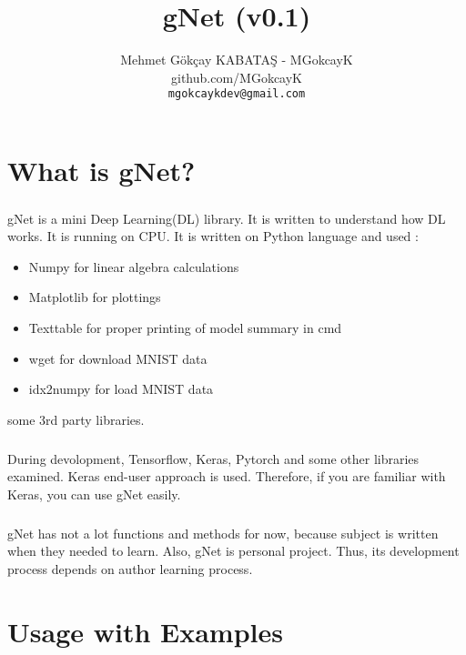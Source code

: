 \documentclass[12pt]{report}
\title {gNet (v0.1)}
\author{Mehmet Gökçay KABATAŞ - MGokcayK \\ github.com/MGokcayK \\ \texttt{mgokcaykdev@gmail.com}
}
\begin{document}
\maketitle
\tableofcontents





\chapter{What is gNet?}

\paragraph{}
gNet is a mini Deep Learning(DL) library. It is written to understand how DL works. It is running on CPU. It is written on Python language and used :

\begin{itemize}
	\item Numpy for linear algebra calculations
	\item Matplotlib for plottings
	\item Texttable for proper printing of model summary in cmd
	\item wget for download MNIST data
	\item idx2numpy for load MNIST data
\end{itemize}

some 3rd party libraries.

\paragraph{}
During devolopment, Tensorflow, Keras, Pytorch and some other libraries examined. Keras end-user approach is used. Therefore, if you are familiar with Keras, you can use gNet easily. 

\paragraph{}
gNet has not a lot functions and methods for now, because subject is written when they needed to learn. Also, gNet is personal project. Thus, its development process depends on author learning process.





\chapter{Usage with Examples}
\end{document}
